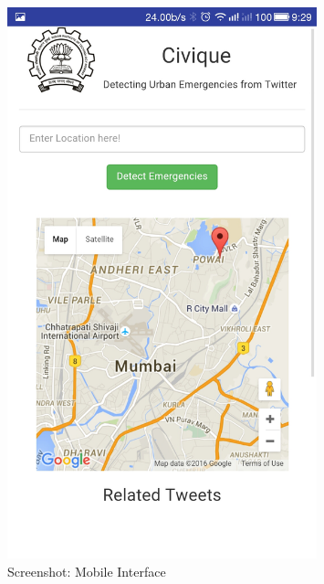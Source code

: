 \documentclass[12pt, a4paper]{article}
\begin{document}
\begin{figure}[h]
\begin{minipage}{0.48\textwidth}
	\centering
	\includegraphics[width=0.8\textwidth]{and1.jpg}
	\caption{Screenshot: Mobile Interface}
	\label{fig:and1 }
\end{minipage}%
	\begin{minipage}{0.48\textwidth}
	\centering

\end{minipage}
\end{figure}
\end{document}
